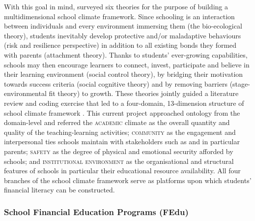 With this goal in mind, \textcite{wang:2016} surveyed six theories for the purpose of building a multidimensional school climate framework. Since schooling is an interaction between individuals and every environment immersing them (the bio-ecological theory), students inevitably develop protective and/or maladaptive behaviours (risk and resilience perspective) in addition to all existing bonds they formed with parents (attachment theory). Thanks to students' ever-growing capabilities, schools may then encourage learners to connect, invest, participate and believe in their learning environment (social control theory), by bridging their motivation towards success criteria (social cognitive theory) and by removing barriers (stage-
environmental fit theory) to growth. These theories jointly guided a literature review and coding exercise that led to a four-domain, 13-dimension structure of school climate framework \parencite[see Figure 1,][p. 318]{wang:2016}. This current project approached  ontology from the domain-level and referred the \textsc{academic} climate as the overall quantity and quality of the teaching-learning activities; \textsc{community} as the engagement and interpersonal ties schools maintain with stakeholders such as and in particular parents; \textsc{safety} as the degree of physical and emotional security afforded by schools; and \textsc{institutional environment} as the organisational and structural features of schools in particular their educational resource availability. All four branches of the school climate framework serve as platforms upon which students' financial literacy can be constructed.

\subsubsection{School Financial Education Programs (FEdu)}


